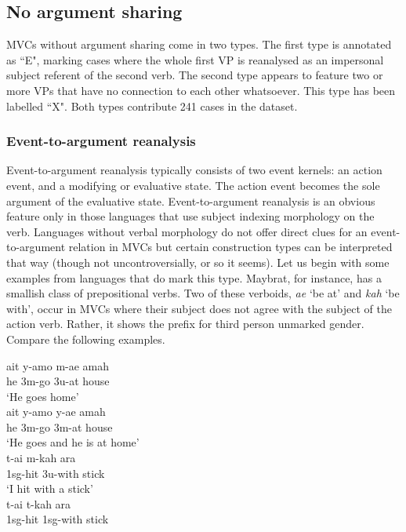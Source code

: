 \subsection{No argument sharing}

MVCs without argument sharing come in two types. The first type is annotated as ``E", marking cases where the whole first VP is reanalysed as an impersonal subject referent of the second verb. The second type appears to feature two or more VPs that have no connection to each other whatsoever. This type has been labelled ``X". Both types contribute 241 cases in the dataset.

\subsubsection{Event-to-argument reanalysis}\label{sec:event-to-argument}

Event-to-argument reanalysis typically consists of two event kernels: an action event, and a modifying or evaluative state. The action event becomes the sole argument of the evaluative state. Event-to-argument reanalysis is an obvious feature only in those languages that use subject indexing morphology on the verb. Languages without verbal morphology do not offer direct clues for an event-to-argument relation in MVCs but certain construction types can be interpreted that way (though not uncontroversially, or so it seems). Let us begin with some examples from languages that do mark this type. Maybrat, for instance, has a smallish class of prepositional verbs. Two of these verboids, \textit{ae} `be at' and \textit{kah} `be with', occur in MVCs where their subject does not agree with the subject of the action verb. Rather, it shows the prefix for third person unmarked gender. Compare the following examples.

\pex \label{maybrat002}
\a
\gll ait y-amo m-ae amah \\
he 3\acs{m}-go 3\acs{u}-at house \\
\glft `He goes home' \\ 
\z
\a
\gll ait y-amo y-ae amah \\ 
he 3\acs{m}-go 3\acs{m}-at house \\
\glft `He goes and he is at home'\\ 
\z
\xe
\pex \label{maybrat003}
\a
\gll t-ai m-kah ara \\
1\acs{sg}-hit 3\acs{u}-with stick \\
\glft `I hit with a stick' \\ 
\z
\a
\gll *t-ai t-kah ara \\ 
1\acs{sg}-hit 1\acs{sg}-with stick \\
\glft {}\\ 
\z
\xe

